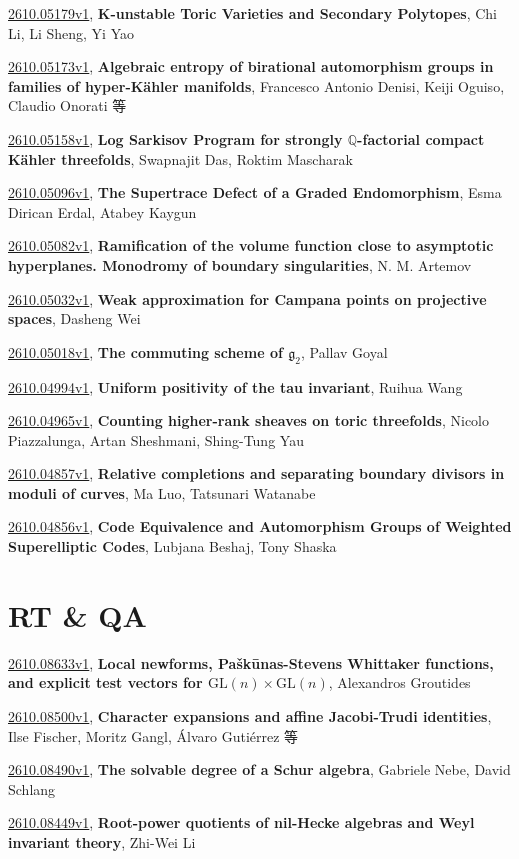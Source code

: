\documentclass[9pt, a4paper]{article}
\theoremstyle{plain}
\theoremstyle{definition}
\theoremstyle{remark}
\newcommand{\arxiv}[3]{\href{https://arxiv.org/abs/#1}{#1}, \textbf{\textcolor{arxivblue}{#2}}, #3}
\begin{document}
\arxiv{2610.05179v1}{K-unstable Toric Varieties and Secondary Polytopes}{Chi Li, Li Sheng, Yi Yao}

\arxiv{2610.05173v1}{Algebraic entropy of birational automorphism groups in families of hyper-Kähler manifolds}{Francesco Antonio Denisi, Keiji Oguiso, Claudio Onorati 等}

\arxiv{2610.05158v1}{Log Sarkisov Program for strongly $\mathbb{Q}$-factorial compact Kähler threefolds}{Swapnajit Das, Roktim Mascharak}

\arxiv{2610.05096v1}{The Supertrace Defect of a Graded Endomorphism}{Esma Dirican Erdal, Atabey Kaygun}

\arxiv{2610.05082v1}{Ramification of the volume function close to asymptotic hyperplanes. Monodromy of boundary singularities}{N. M. Artemov}

\arxiv{2610.05032v1}{Weak approximation for Campana points on projective spaces}{Dasheng Wei}

\arxiv{2610.05018v1}{The commuting scheme of $\mathfrak{g}_2$}{Pallav Goyal}

\arxiv{2610.04994v1}{Uniform positivity of the tau invariant}{Ruihua Wang}

\arxiv{2610.04965v1}{Counting higher-rank sheaves on toric threefolds}{Nicolo Piazzalunga, Artan Sheshmani, Shing-Tung Yau}

\arxiv{2610.04857v1}{Relative completions and separating boundary divisors in moduli of curves}{Ma Luo, Tatsunari Watanabe}

\arxiv{2610.04856v1}{Code Equivalence and Automorphism Groups of Weighted Superelliptic Codes}{Lubjana Beshaj, Tony Shaska}


\section{RT \& QA}
\arxiv{2610.08633v1}{Local newforms, Paškūnas-Stevens Whittaker functions, and explicit test vectors for $\mathrm{GL}(n)\times \mathrm{GL}(n)$}{Alexandros Groutides}

\arxiv{2610.08500v1}{Character expansions and affine Jacobi-Trudi identities}{Ilse Fischer, Moritz Gangl, Álvaro Gutiérrez 等}

\arxiv{2610.08490v1}{The solvable degree of a Schur algebra}{Gabriele Nebe, David Schlang}

\arxiv{2610.08449v1}{Root-power quotients of nil-Hecke algebras and Weyl invariant theory}{Zhi-Wei Li}
\end{document}
